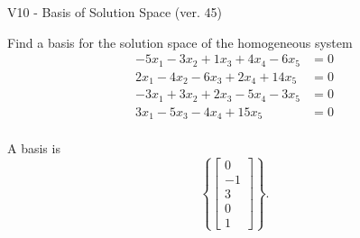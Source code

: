 \begin{exercise}
  \begin{exerciseTitle}V10 - Basis of Solution Space (ver. 45)\end{exerciseTitle}
  \begin{exerciseStatement}
    Find a basis for the solution space of the homogeneous system 
\begin{align*}
 -5 x_ 1 -3 x_ 2 + 1 x_ 3 + 4 x_ 4 -6 x_ 5 &= 0  \\ 
  2 x_ 1 -4 x_ 2 -6 x_ 3 + 2 x_ 4 + 14 x_ 5 &= 0  \\ 
  -3 x_ 1 + 3 x_ 2 + 2 x_ 3 -5 x_ 4 -3 x_ 5 &= 0  \\ 
  3 x_ 1 -5 x_ 3 -4 x_ 4 + 15 x_ 5 &= 0  \\ 
 \end{align*}


 
  \end{exerciseStatement}

  \begin{exerciseAnswer}
   A basis is   
\[\left\{\left[\begin{array}{c}
0 \\
-1 \\
3 \\
0 \\
1
\end{array}\right]\right\}.\]

  


  \end{exerciseAnswer}
\end{exercise}